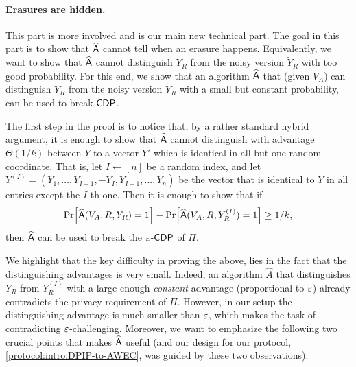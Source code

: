 \paragraph{Erasures are hidden.}
This part is more involved and is our main new technical part. The goal in this part is to show that $\widehat{\mathsf{A}}$ cannot tell when an erasure happens. Equivalently, we want to show that $\widehat{\mathsf{A}}$ cannot distinguish $Y_R$ from the noisy version $\widetilde{Y}_R$ with too good probability. For this end, we show that an algorithm $\widehat{\mathsf{A}}$ that (given $V_A$) can distinguish $Y_R$ from the noisy version $\widetilde{Y}_R$ with a small but constant probability, can be used to break ${\sf CDP}$. 

The first step in the proof is to notice that, by a rather standard hybrid argument, it is enough to show that $\widehat{\mathsf{A}}$ cannot distinguish with advantage $\Theta(1/k)$ between $Y$ to a vector $Y'$ which is identical in all but one random coordinate. That is, let $I\gets [n]$ be a random index, and let  $Y^{(I)}=(Y_1,\dots,Y_{I-1},-Y_I,Y_{I+1},...,Y_n)$ be  the vector that is identical to $Y$ in all entries except the $I$-th one. Then it is enough to show that if 
\[ \pr{\widehat{\Ac}(V_A,R,Y_R)=1}-\pr{\widehat{\Ac}(V_A,R,Y^{(I)}_R)=1} \ge 1/k,\]
  then $\widehat{\mathsf{A}}$ can be used to break the $\varepsilon$-${\sf CDP}$ of $\Pi$.


We highlight that the key difficulty in proving the above, lies in the fact that the distinguishing advantages is very small. Indeed, an algorithm $\widehat{A}$ that distinguishes $Y_R$ from $Y^{(I)}_R$ with a large enough \emph{constant} advantage (proportional to $\varepsilon$) already contradicts the privacy requirement of $\Pi$. However, in our setup the distinguishing advantage is much smaller than $\varepsilon$, which makes the task of contradicting $\varepsilon$-\CDP challenging. Moreover, we want to emphasize the following two crucial points that makes $\widehat{\mathsf{A}}$ useful (and our design for our \AWEC protocol, \cref{protocol:intro:DPIP-to-AWEC}, was guided by these two observations).

